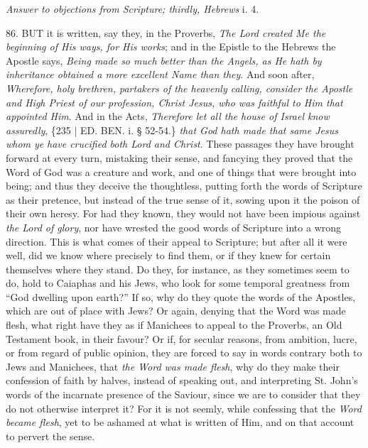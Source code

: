 
\emph{Answer
to objections from Scripture; thirdly, Hebrews}
i. 4.

86. BUT
it is written, say they, in the Proverbs, \emph{The Lord created Me the
beginning of His ways, for His works}; and in the Epistle to the
Hebrews the Apostle says, \emph{Being made so much better than the
Angels, as He hath by inheritance obtained a more excellent Name than
they}. And soon after, \emph{Wherefore, holy brethren, partakers of
the heavenly calling, consider the Apostle and High Priest of our
profession, Christ Jesus, who was faithful to Him that appointed Him}.
And in the Acts, \emph{Therefore let all the house of Israel know
assuredly}, \{235 | ED. BEN.
i. § 52-54.\} \emph{that God hath made that same Jesus whom ye} \emph{have
crucified both Lord and Christ}. These passages they have brought
forward at every turn, mistaking their sense, and fancying they proved
that the Word of God was a creature and work, and one of things that
were brought into being; and thus they deceive the thoughtless,
putting forth the words of Scripture as their pretence, but instead of
the true sense of it, sowing upon it the poison of their own heresy.
For had they known, they would not have been impious against \emph{the
Lord of glory}, nor have wrested the good words of Scripture into a
wrong direction. This is what comes of their appeal to Scripture; but
after all it were well, did we know where precisely to find them, or
if they knew for certain themselves where they stand. Do they, for
instance, as they sometimes seem to do, hold to Caiaphas and his Jews,
who look for some temporal greatness from ``God dwelling upon earth?''
If so, why do they quote the words of the Apostles, which are out of
place with Jews? Or again, denying that the Word was made flesh, what
right have they as if Manichees to appeal to the Proverbs, an Old
Testament book, in their favour? Or if, for secular reasons, from
ambition, lucre, or from regard of public opinion, they are forced to
say in words contrary both to Jews and Manichees, that \emph{the Word was
made flesh}, why do they make their confession of faith by halves,
instead of speaking out, and interpreting St. John's words of the
incarnate presence of the Saviour, since we are to consider that they
do not otherwise interpret it? For it is not seemly, while confessing
that the \emph{Word became flesh}, yet to be ashamed at what is
written of Him, and on that account to pervert the sense.

